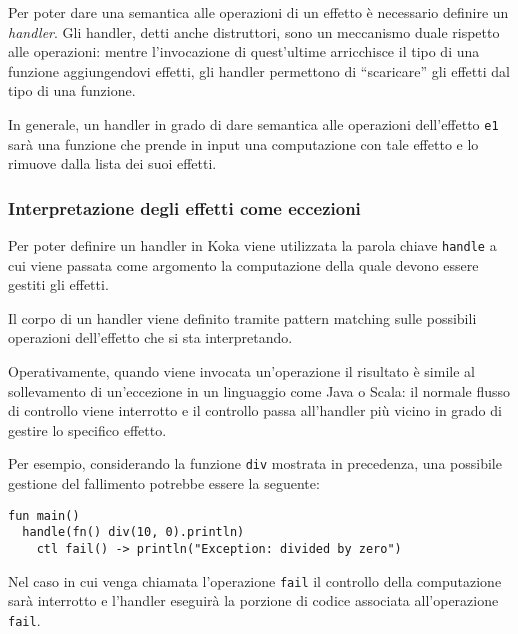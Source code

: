Per poter dare una semantica alle operazioni di un effetto è necessario definire un \emph{handler}. Gli handler, detti anche distruttori, sono un meccanismo duale rispetto alle operazioni: mentre l'invocazione di quest'ultime arricchisce il tipo di una funzione aggiungendovi effetti, gli handler permettono di ``scaricare'' gli effetti dal tipo di una funzione.

In generale, un handler in grado di dare semantica alle operazioni dell'effetto \lstinline{e1} sarà una funzione che prende in input una computazione con tale effetto e lo rimuove dalla lista dei suoi effetti.

\subsubsection{Interpretazione degli effetti come eccezioni}
Per poter definire un handler in Koka viene utilizzata la parola chiave \lstinline{handle} a cui viene passata come argomento la computazione della quale devono essere gestiti gli effetti.

Il corpo di un handler viene definito tramite pattern matching sulle possibili operazioni dell'effetto che si sta interpretando.

Operativamente, quando viene invocata un'operazione il risultato è simile al sollevamento di un'eccezione in un linguaggio come Java o Scala: il normale flusso di controllo viene interrotto e il controllo passa all'handler più vicino in grado di gestire lo specifico effetto.

Per esempio, considerando la funzione \lstinline{div} mostrata in precedenza, una possibile gestione del fallimento potrebbe essere la seguente:
\begin{lstlisting}[language=koka]
fun main()
  handle(fn() div(10, 0).println)
    ctl fail() -> println("Exception: divided by zero")
\end{lstlisting}

Nel caso in cui venga chiamata l'operazione \lstinline{fail} il controllo della computazione sarà interrotto e l'handler eseguirà la porzione di codice associata all'operazione \lstinline{fail}.

